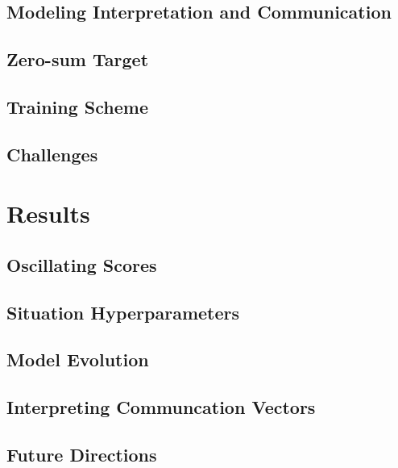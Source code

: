 \documentclass[10pt,twocolumn,letterpaper]{article}
\begin{document}
\subsection{Modeling Interpretation and Communication}
\subsection{Zero-sum Target}
\subsection{Training Scheme}
\subsection{Challenges}

\section{Results}
\subsection{Oscillating Scores}
\subsection{Situation Hyperparameters}
\subsection{Model Evolution}
\subsection{Interpreting Communcation Vectors}
\subsection{Future Directions}


{\small


}
\end{document}
